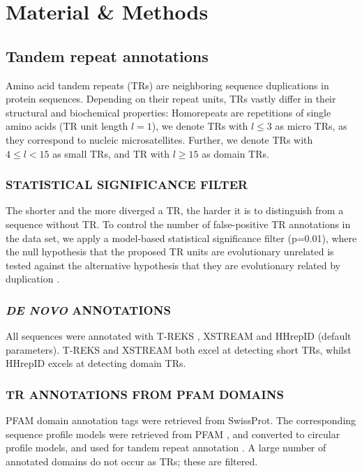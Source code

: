 \documentclass[a4,center,fleqn]{NAR}
\begin{document}
\section{Material \& Methods}
\subsection{Tandem repeat annotations}
Amino acid tandem repeats (TRs) are neighboring sequence duplications in protein sequences. Depending on their repeat units, TRs vastly differ in their structural and biochemical properties: Homorepeats are repetitions of single amino acids (TR unit length $l=1$),
we denote TRs with $l\leq3$ as micro TRs, as they correspond to nucleic microsatellites. Further, we denote TRs with $4\leq l<15$ as small TRs, and TR with $l\geq15$ as domain TRs.

\subsubsection{\MakeUppercase{Statistical significance filter}}
The shorter and the more diverged a TR, the harder it is to distinguish from a sequence without TR. To control the number of false-positive TR annotations in the data set, we apply a model-based statistical significance filter (p=0.01), where the null hypothesis that the proposed TR units are evolutionary unrelated is tested against the alternative hypothesis that they are evolutionary related by duplication \cite{Schaper2012}.

\subsubsection{\MakeUppercase{\textit{de novo} annotations}}
All sequences were annotated with T-REKS \cite{Jorda2009}, XSTREAM \cite{Newman2007} and HHrepID \cite{Biegert2008} (default parameters).
T-REKS and XSTREAM both excel at detecting short TRs, whilst HHrepID excels at detecting domain TRs.

\subsubsection{\MakeUppercase{TR annotations from PFAM domains}}
PFAM domain annotation tags were retrieved from SwissProt. The corresponding sequence profile models were retrieved from PFAM \cite{Finn2015}, and converted to circular profile models, and used for tandem repeat annotation \cite{Schaper2014}. A large number of annotated domains do not occur as TRs; these are filtered.
\end{document}
